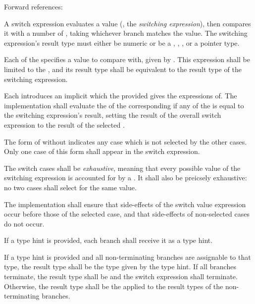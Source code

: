 Forward references: 

\specsubsubitem
A switch expression evaluates a value (, the
\textit{switching expression}), then compares it with a number of
, taking whichever branch matches the value. The
switching expression's result type must either be numeric or be a
, , , or a pointer type.

\specsubsubitem
Each of the  specifies a value to compare with, given
by . This expression shall be limited to the
, and its result type shall be
equivalent to the result type of the switching expression.

\specsubsubitem
Each  introduces an implicit
 which the provided
 gives the expressions of. The implementation
shall evaluate the  of the corresponding
 if any of the  is equal to
the switching expression's result, setting the result of the overall switch
expression to the result of the selected .


\specsubsubitem
The form of  without 
indicates any case which is not selected by the other cases. Only one case of
this form shall appear in the switch expression.

\specsubsubitem
The switch cases shall be \textit{exhaustive}, meaning that every possible
value of the switching expression is accounted for by a
. It shall also be preicsely exhaustive: no two cases
shall select for the same value.

\specsubsubitem
The implementation shall ensure that side-effects of the switch value
expression occur before those of the selected case, and that side-effects of
non-selected cases do not occur.

\specsubsubitem
If a type hint is provided, each branch shall receive it as a type hint.

\specsubsubitem
If a type hint is provided and all non-terminating branches are assignable to
that type, the result type shall be the type given by the type hint. If all
branches terminate, the result type shall be  and the switch
expression shall terminate. Otherwise, the result type shall be the
 applied to the result types of the
non-terminating branches.


